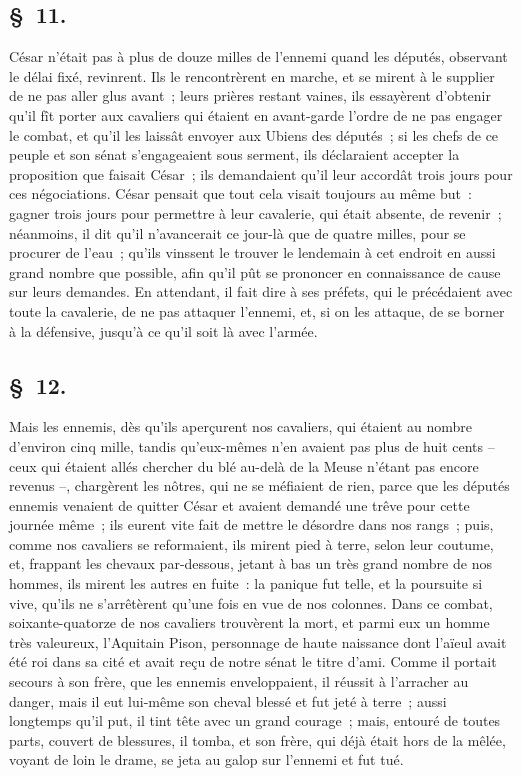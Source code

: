 \documentclass[french,twoside]{book} %
\begin{document}
\subsection[{§ 11.}]{ \textsc{§ 11.} }
\noindent César n’était pas à plus de douze milles de l’ennemi quand les députés, observant le délai fixé, revinrent. Ils le rencontrèrent en marche, et se mirent à le supplier de ne pas aller glus avant ; leurs prières restant vaines, ils essayèrent d’obtenir qu’il fît porter aux cavaliers qui étaient en avant-garde l’ordre de ne pas engager le combat, et qu’il les laissât envoyer aux Ubiens des députés ; si les chefs de ce peuple et son sénat s’engageaient sous serment, ils déclaraient accepter la proposition que faisait César ; ils demandaient qu’il leur accordât trois jours pour ces négociations. César pensait que tout cela visait toujours au même but : gagner trois jours pour permettre à leur cavalerie, qui était absente, de revenir ; néanmoins, il dit qu’il n’avancerait ce jour-là que de quatre milles, pour se procurer de l’eau ; qu’ils vinssent le trouver le lendemain à cet endroit en aussi grand nombre que possible, afin qu’il pût se prononcer en connaissance de cause sur leurs demandes. En attendant, il fait dire à ses préfets, qui le précédaient avec toute la cavalerie, de ne pas attaquer l’ennemi, et, si on les attaque, de se borner à la défensive, jusqu’à ce qu’il soit là avec l’armée.
\subsection[{§ 12.}]{ \textsc{§ 12.} }
\noindent Mais les ennemis, dès qu’ils aperçurent nos cavaliers, qui étaient au nombre d’environ cinq mille, tandis qu’eux-mêmes n’en avaient pas plus de huit cents – ceux qui étaient allés chercher du blé au-delà de la Meuse n’étant pas encore revenus –, chargèrent les nôtres, qui ne se méfiaient de rien, parce que les députés ennemis venaient de quitter César et avaient demandé une trêve pour cette journée même ; ils eurent vite fait de mettre le désordre dans nos rangs ; puis, comme nos cavaliers se reformaient, ils mirent pied à terre, selon leur coutume, et, frappant les chevaux par-dessous, jetant à bas un très grand nombre de nos hommes, ils mirent les autres en fuite : la panique fut telle, et la poursuite si vive, qu’ils ne s’arrêtèrent qu’une fois en vue de nos colonnes. Dans ce combat, soixante-quatorze de nos cavaliers trouvèrent la mort, et parmi eux un homme très valeureux, l’Aquitain Pison, personnage de haute naissance dont l’aïeul avait été roi dans sa cité et avait reçu de notre sénat le titre d’ami. Comme il portait secours à son frère, que les ennemis enveloppaient, il réussit à l’arracher au danger, mais il eut lui-même son cheval blessé et fut jeté à terre ; aussi longtemps qu’il put, il tint tête avec un grand courage ; mais, entouré de toutes parts, couvert de blessures, il tomba, et son frère, qui déjà était hors de la mêlée, voyant de loin le drame, se jeta au galop sur l’ennemi et fut tué.
\end{document}
